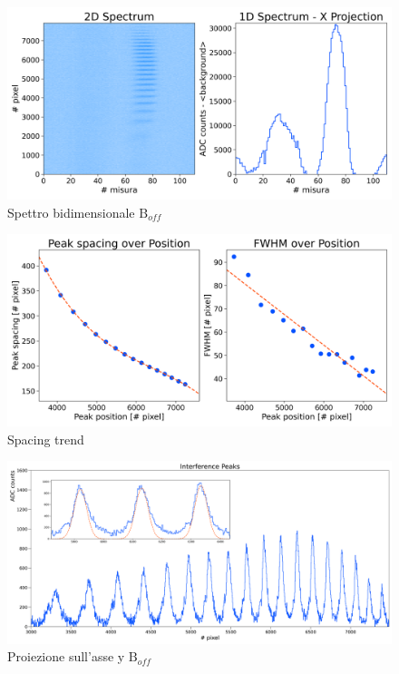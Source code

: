 \documentclass[twocolumn,10pt]{asme2ej}
\begin{document}
\begin{figure}
    \centering
    \includegraphics[width=\linewidth]{../Plots/Boff_2d_spectrum.png}
    \caption{Spettro bidimensionale $\text{B}_{off}$}
    \label{i:spettro2d_Boff}
\end{figure}


\begin{figure}
    \centering
    \includegraphics[width=\linewidth]{../Plots/Boff_spacing_trend.png}
    \caption{Spacing trend}
    \label{i:spacing_trend_Boff}
\end{figure}


\begin{figure}
    \centering
    \includegraphics[width=\textwidth]{../Plots/Boff_Y_proj.png}
    \caption{Proiezione sull'asse y $\text{B}_{off}$}
    \label{i:spettro2d_Boff_ProjY}
\end{figure}
\end{document}
